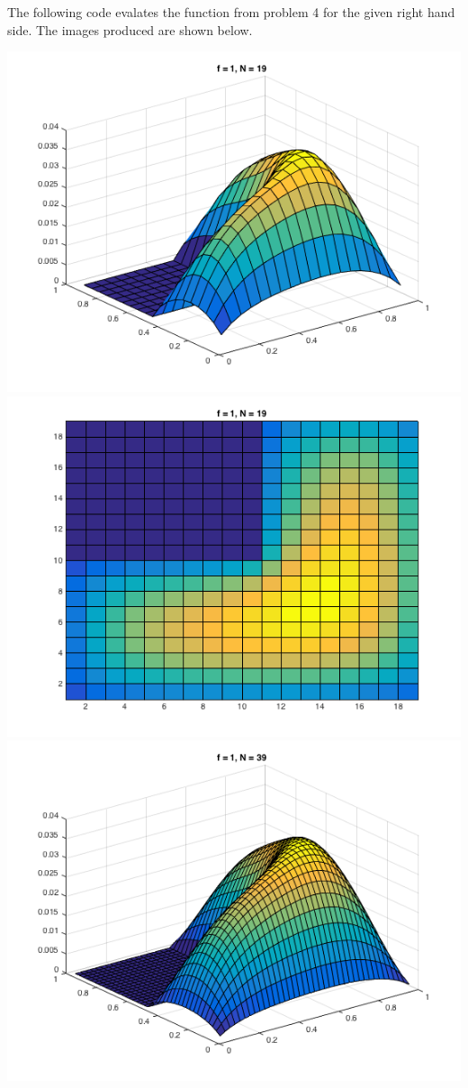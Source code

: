 \documentclass[11pt, oneside, titlepage]{article}
\begin{document}
\begin{enumerate}
        The following code evalates the function from problem 4 for the
        given right hand side.
        The images produced are shown below.
        
        \begin{center}
            \includegraphics[scale=.5]{Figures/03_6_1.png}
            \includegraphics[scale=.5]{Figures/03_6_2.png}
            \includegraphics[scale=.5]{Figures/03_6_3.png}

\end{center}
\end{enumerate}
\end{document}
